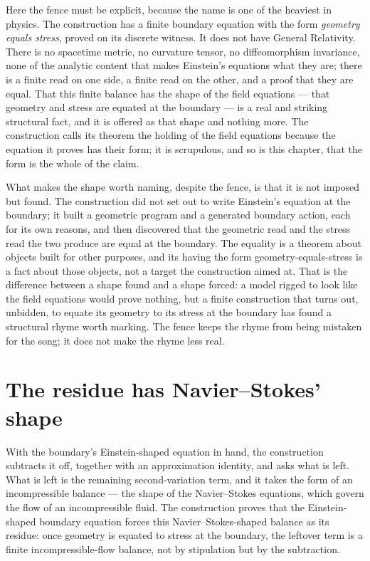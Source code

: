 Here the fence must be explicit, because the name is one of the heaviest in physics. The construction has
a finite boundary equation with the form \emph{geometry equals stress}, proved on its discrete witness.
It does not have General Relativity. There is no spacetime metric, no curvature tensor, no diffeomorphism
invariance, none of the analytic content that makes Einstein's equations what they are; there is a finite
read on one side, a finite read on the other, and a proof that they are equal. That this finite balance
has the shape of the field equations --- that geometry and stress are equated at the boundary --- is a
real and striking structural fact, and it is offered as that shape and nothing more. The construction
calls its theorem the holding of the field equations because the equation it proves has their form; it is
scrupulous, and so is this chapter, that the form is the whole of the claim.

What makes the shape worth naming, despite the fence, is that it is not imposed but found. The
construction did not set out to write Einstein's equation at the boundary; it built a geometric program
and a generated boundary action, each for its own reasons, and then discovered that the geometric read and
the stress read the two produce are equal at the boundary. The equality is a theorem about objects built
for other purposes, and its having the form geometry-equals-stress is a fact about those objects, not a
target the construction aimed at. That is the difference between a shape found and a shape forced: a model
rigged to look like the field equations would prove nothing, but a finite construction that turns out,
unbidden, to equate its geometry to its stress at the boundary has found a structural rhyme worth marking.
The fence keeps the rhyme from being mistaken for the song; it does not make the rhyme less real.

\section{The residue has Navier--Stokes' shape}
\label{se:the-residue-has-navier-stokes-shape}

With the boundary's Einstein-shaped equation in hand, the construction subtracts it off, together with an
approximation identity, and asks what is left. What is left is the remaining second-variation term, and
it takes the form of an incompressible balance --- the shape of the Navier--Stokes equations, which
govern the flow of an incompressible fluid. The construction proves that the Einstein-shaped boundary
equation forces this Navier--Stokes-shaped balance as its residue: once geometry is equated to stress at
the boundary, the leftover term is a finite incompressible-flow balance, not by stipulation but by the
subtraction.

